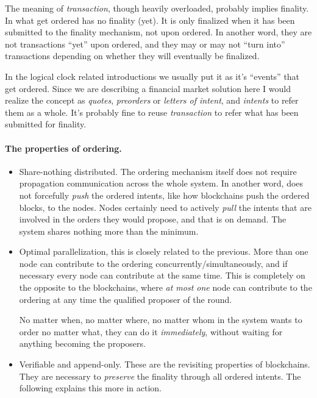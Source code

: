 The meaning of \emph{transaction}, though heavily overloaded, probably implies finality.
In \sys what get ordered has no finality (yet).
It is only finalized when it has been submitted to the finality mechanism, not upon ordered.
In another word, they are not transactions ``yet'' upon ordered, and they may or may not ``turn into'' transactions depending on whether they will eventually be finalized.

In the logical clock related introductions we usually put it as it's ``events'' that get ordered.
Since we are describing a financial market solution here I would realize the concept as \emph{quotes}, \emph{preorders} or \emph{letters of intent}, and \emph{intents} to refer them as a whole.
It's probably fine to reuse \emph{transaction} to refer what has been submitted for finality.

\paragraph{The properties of ordering.}
\begin{itemize}
    \item Share-nothing distributed.
    The ordering mechanism itself does not require propagation \ie communication across the whole system.
    In another word, \sys does not forcefully \emph{push} the ordered intents, like how blockchains push the ordered blocks, to the nodes.
    Nodes certainly need to actively \emph{pull} the intents that are involved in the orders they would propose, and that is on demand.
    The system shares nothing more than the minimum.
    
    \item Optimal parallelization, this is closely related to the previous.
    More than one node can contribute to the ordering concurrently/simultaneously, and if necessary every node can contribute at the same time.
    This is completely on the opposite to the blockchains, where \emph{at most one} node can contribute to the ordering at any time \ie the qualified proposer of the round.

    No matter when, no matter where, no matter whom in the \sys system wants to order no matter what, they can do it \emph{immediately}, without waiting for anything \eg becoming the proposers.
    
    \item Verifiable and append-only.
    These are the revisiting properties of blockchains.
    They are necessary to \emph{preserve} the finality through all ordered intents.
    The following explains this more in action.
\end{itemize}

